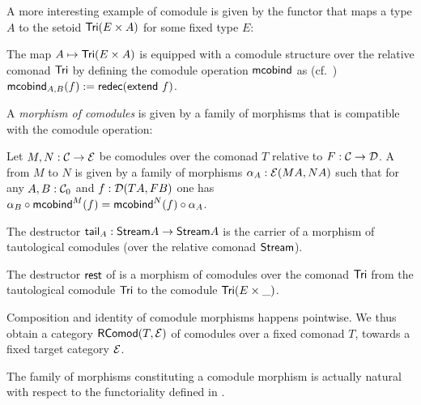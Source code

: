 \documentclass[envcountsame]{llncs}
\begin{document}
A more interesting example of comodule is given by the functor that maps a type $A$ to the setoid $\Tri(E\times A)$
for some fixed type $E$:
\begin{example}\label{ex_tri_prod_comod}
   The map $A \mapsto \Tri(E\times A)$ is equipped with a comodule structure over the relative comonad $\Tri$ by
   defining the comodule operation $\mcobind$ as (cf.\ )
     $ \mcobind_{A,B} (f) := \redec (\extend~f)$.
\end{example}



A \emph{morphism of comodules} is given by a family of morphisms that is compatible with 
the comodule operation:

\begin{definition}%
\label{def:morphism_of_comodules}
 Let $M, N : \C \to \E$ be comodules over the comonad $T$ relative to  $F:\C \to \D$.
 A  from $M$ to $N$ is given by a family of morphisms 
   $ \alpha_A:\E(MA,NA) $
 such that for any $A,B:\C_0$ and $f : \D(TA,FB)$ one has
 $\comp{\mcobind^M(f)}{\alpha_B} = \comp{\alpha_A}{\mcobind^N(f)}$.
\end{definition}

 \begin{example}\label{ex_tail_comodule}
  The destructor $\stail_A : \stream A \to \stream A$ is the carrier of a morphism of tautological comodules (over the relative comonad $\stream$).
 \end{example}

\begin{example}\label{ex:tail_comodule}
 The destructor $\tail$ of  is a morphism of comodules over the comonad $\Tri$ 
  from the tautological comodule  $\Tri$ to the comodule $\Tri(E\times \_)$. %
\end{example}

Composition and identity of comodule morphisms happens pointwise. We thus obtain a category $\RComod(T,\E)$
 of comodules
over a fixed comonad $T$, towards a fixed target category $\E$.

% 


\begin{Long}
\begin{remark}
  The family of morphisms constituting a comodule morphism is actually natural with respect to the functoriality 
  defined in .
\end{remark}
\end{Long}
\end{document}
